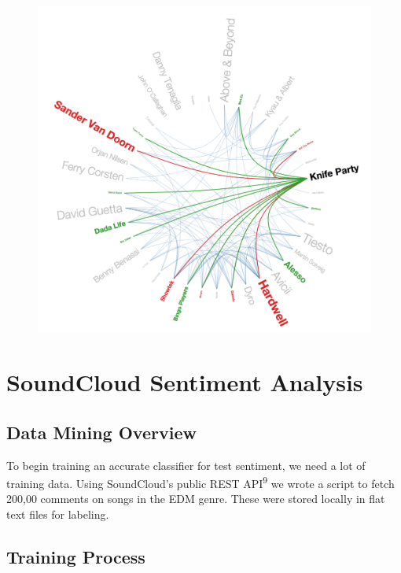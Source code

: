 \documentclass[12pt]{dalcsthesis}
\begin{document}
\begin{figure}[h]
\includegraphics[scale=.5]{knife_party}
\centering
\end{figure}

\chapter{SoundCloud Sentiment Analysis}

\section{Data Mining Overview}

To begin training an accurate classifier for test sentiment, we need a lot of training data. Using SoundCloud's public REST API\textsuperscript{9} we wrote a script to fetch 200,00 comments on songs in the EDM genre. These were stored locally in flat text files for labeling.

\section{Training Process}
\end{document}
